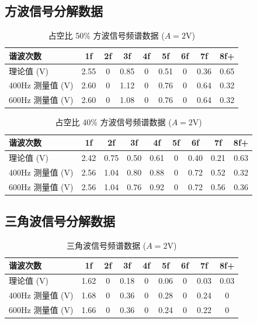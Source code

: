 \documentclass[12pt, a4paper]{ctexrep}
\begin{document}
\subsection{方波信号分解数据}
\begin{table}[H]
    \centering
    \caption{占空比 50\% 方波信号频谱数据 ($A=2\text{V}$)}
    \label{tab:sq50}
    \begin{tabular}{lcccccccc}
        \toprule
        \textbf{谐波次数} & \textbf{1f} & \textbf{2f} & \textbf{3f} & \textbf{4f} & \textbf{5f} & \textbf{6f} & \textbf{7f} & \textbf{8f+} \\
        \midrule
        理论值 (V) & 2.55 & 0 & 0.85 & 0 & 0.51 & 0 & 0.36 & 0.65 \\
        400Hz 测量值 (V) & 2.60 & 0 & 1.12 & 0 & 0.76 & 0 & 0.64 & 0.32 \\
        600Hz 测量值 (V) & 2.60 & 0 & 1.08 & 0 & 0.76 & 0 & 0.64 & 0.32 \\
        \bottomrule
    \end{tabular}
\end{table}
\begin{table}[H]
    \centering
    \caption{占空比 40\% 方波信号频谱数据 ($A=2\text{V}$)}
    \label{tab:sq40}
    \begin{tabular}{lcccccccc}
        \toprule
        \textbf{谐波次数} & \textbf{1f} & \textbf{2f} & \textbf{3f} & \textbf{4f} & \textbf{5f} & \textbf{6f} & \textbf{7f} & \textbf{8f+} \\
        \midrule
        理论值 (V) & 2.42 & 0.75 & 0.50 & 0.61 & 0 & 0.40 & 0.21 & 0.63 \\
        400Hz 测量值 (V) & 2.56 & 1.04 & 0.80 & 0.88 & 0 & 0.72 & 0.52 & 0.32 \\
        600Hz 测量值 (V) & 2.56 & 1.04 & 0.76 & 0.92 & 0 & 0.72 & 0.56 & 0.36 \\
        \bottomrule
    \end{tabular}
\end{table}
\subsection{三角波信号分解数据}
\begin{table}[H]
    \centering
    \caption{三角波信号频谱数据 ($A=2\text{V}$)}
    \label{tab:tri}
    \begin{tabular}{lcccccccc}
        \toprule
        \textbf{谐波次数} & \textbf{1f} & \textbf{2f} & \textbf{3f} & \textbf{4f} & \textbf{5f} & \textbf{6f} & \textbf{7f} & \textbf{8f+} \\
        \midrule
        理论值 (V) & 1.62 & 0 & 0.18 & 0 & 0.06 & 0 & 0.03 & 0.03 \\
        400Hz 测量值 (V) & 1.68 & 0 & 0.36 & 0 & 0.28 & 0 & 0.24 & 0 \\
        600Hz 测量值 (V) & 1.66 & 0 & 0.36 & 0 & 0.24 & 0 & 0.22 & 0 \\
        \bottomrule
    \end{tabular}
\end{table}
\end{document}

